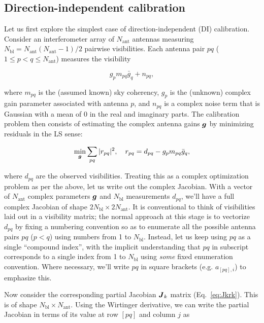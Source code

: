 \documentclass[useAMS,usenatbib]{mn2e}
\newcommand{\mat}[1]{{\bmath{#1}}}
\newcommand{\JJ}{\mat{J}} %
\begin{document}
\subsection{Direction-independent calibration}
\label{sec:unpol:DI}

\newcommand{\Na}{N_\mathrm{ant}}
\newcommand{\Nbl}{N_\mathrm{bl}}
\newcommand{\Nd}{N_\mathrm{dir}}

Let us first explore the simplest case of direction-independent (DI) calibration. Consider an interferometer
array of $\Na$ antennas measuring $\Nbl=\Na(\Na-1)/2$ pairwise visibilities. Each antenna pair $pq$ ($1\leq p<q\leq \Na$) 
measures the visibility

\begin{equation}
\label{eq:RIME:unpol}
g_p m_{pq} \bar{g}_q + n_{pq},
\end{equation}

where $m_{pq}$ is the (assumed known) sky coherency, $g_p$ is the (unknown) complex gain parameter 
associated with antenna $p$, and $n_{pq}$ is a complex noise term that is Gaussian with a mean of 0 in the real and 
imaginary parts. The calibration problem then consists of estimating the complex antenna gains $\bmath{g}$ by
minimizing residuals in the LS sense:

\begin{equation}
\label{eq:cal:DI}
\min_{\bmath{g}}\sum_{pq}|r_{pq}|^2,~~~r_{pq}=d_{pq}-g_p m_{pq} \bar{g}_q, 
\end{equation}

where $d_{pq}$ are the observed visibilities. Treating this as a complex optimization problem as per the above, 
let us write out the complex Jacobian. 
With a vector of $\Na$ complex parameters $\bmath{g}$ and $\Nbl$ measurements $d_{pq}$, we'll have a full complex
Jacobian of shape $2\Nbl\times2\Na$. It is conventional
to think of visibilities laid out in a visibility matrix; the normal approach at this stage is to vectorize $d_{pq}$ 
by fixing a numbering convention so as to enumerate all the possible antenna pairs $pq$ ($p<q$) using numbers from 1 to $\Nbl$.
Instead, let us keep using $pq$ as a single ``compound index'', with the implicit understanding that $pq$ in 
subscript corresponds to a single index from 1 to $\Nbl$ using \emph{some} fixed enumeration convention. 
Where necessary, we'll write $pq$ in square brackets (e.g. $a_{[pq],i}$) to emphasize this.

Now consider the corresponding partial Jacobian $\JJ_k$ matrix (Eq.~\ref{eq:Jkrk}). This is of shape $\Nbl\times\Na$. 
Using the Wirtinger derivative, we can write the
partial Jacobian in terms of its value at row $[pq]$ and column $j$ as 
\end{document}
